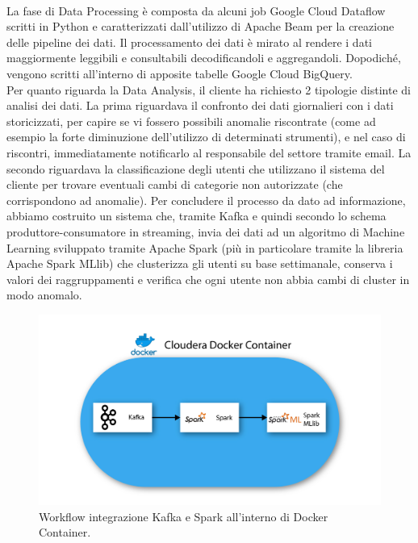 \\
La fase di Data Processing è composta da alcuni job Google Cloud Dataflow scritti in \gls{Python} e caratterizzati dall'utilizzo di Apache Beam per la creazione delle pipeline dei dati.
Il processamento dei dati è mirato al rendere i dati maggiormente leggibili e consultabili decodificandoli e aggregandoli. Dopodiché, vengono scritti all'interno di apposite tabelle Google Cloud BigQuery.
\\
Per quanto riguarda la Data Analysis, il cliente ha richiesto 2 tipologie distinte di analisi dei dati.
La prima riguardava il confronto dei dati giornalieri con i dati storicizzati, per capire se vi fossero possibili anomalie riscontrate (come ad esempio la forte diminuzione dell'utilizzo di determinati strumenti), e nel caso di riscontri, immediatamente notificarlo al responsabile del settore tramite email.
La secondo riguardava la classificazione degli utenti che utilizzano il sistema del cliente per trovare eventuali cambi di categorie non autorizzate (che corrispondono ad anomalie). Per concludere il processo da dato ad informazione, abbiamo costruito un sistema che, tramite Kafka e quindi secondo lo schema produttore-consumatore in streaming, invia dei dati ad un algoritmo di Machine Learning sviluppato tramite Apache Spark (più in particolare tramite la libreria Apache Spark MLlib) che clusterizza gli utenti su base settimanale, conserva i valori dei raggruppamenti e verifica che ogni utente non abbia cambi di cluster in modo anomalo.\\
\begin{figure}[h!]
	\centering
	\includegraphics[scale=0.5]{figures/kafka_spark}
	\caption[Workflow progetto	.]{Workflow integrazione Kafka e Spark all'interno di Docker Container.
		\label{fig:logoGCP}}
\end{figure}	

